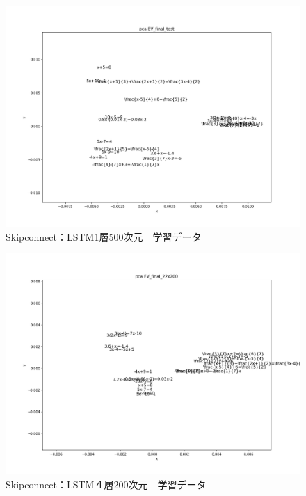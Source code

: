 \documentclass[a4j,11pt,report]{jsbook}
\begin{document}
\begin{center}
  \begin{figure}[tb]
    \centering
    \includegraphics[width=0.7\linewidth]{result/pca_formula_EV_final_test_22x500_1_Wed_Feb_06.png}
    \caption{Skipconnect：LSTM1層500次元　学習データ}
    \label{fig:Skip4layer3}
  \end{figure}
\end{center}

\begin{center}
  \begin{figure}[tb]
    \centering
    \includegraphics[width=0.7\linewidth]{image/pca_formula_EV_final_22x200_1_Wed_Feb_06_04:42:56.png}
    \caption{Skipconnect：LSTM４層200次元　学習データ}
    \label{fig:Skip4layer}
  \end{figure}
\end{center}
\end{document}
